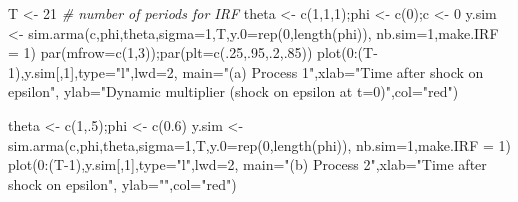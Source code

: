 \documentclass[
  12pt,
]{book}
\newenvironment{Shaded}{\begin{snugshade}}{\end{snugshade}}
\newcommand{\AttributeTok}[1]{\textcolor[rgb]{0.77,0.63,0.00}{#1}}
\newcommand{\CommentTok}[1]{\textcolor[rgb]{0.56,0.35,0.01}{\textit{#1}}}
\newcommand{\DecValTok}[1]{\textcolor[rgb]{0.00,0.00,0.81}{#1}}
\newcommand{\FloatTok}[1]{\textcolor[rgb]{0.00,0.00,0.81}{#1}}
\newcommand{\FunctionTok}[1]{\textcolor[rgb]{0.00,0.00,0.00}{#1}}
\newcommand{\NormalTok}[1]{#1}
\newcommand{\OtherTok}[1]{\textcolor[rgb]{0.56,0.35,0.01}{#1}}
\newcommand{\SpecialCharTok}[1]{\textcolor[rgb]{0.00,0.00,0.00}{#1}}
\newcommand{\StringTok}[1]{\textcolor[rgb]{0.31,0.60,0.02}{#1}}
\theoremstyle{definition}
\theoremstyle{definition}
\theoremstyle{definition}
\theoremstyle{definition}
\theoremstyle{remark}
\begin{document}
\begin{Shaded}
\begin{Highlighting}[]
\NormalTok{T }\OtherTok{\textless{}{-}} \DecValTok{21} \CommentTok{\# number of periods for IRF}
\NormalTok{theta }\OtherTok{\textless{}{-}} \FunctionTok{c}\NormalTok{(}\DecValTok{1}\NormalTok{,}\DecValTok{1}\NormalTok{,}\DecValTok{1}\NormalTok{);phi }\OtherTok{\textless{}{-}} \FunctionTok{c}\NormalTok{(}\DecValTok{0}\NormalTok{);c }\OtherTok{\textless{}{-}} \DecValTok{0}
\NormalTok{y.sim }\OtherTok{\textless{}{-}} \FunctionTok{sim.arma}\NormalTok{(c,phi,theta,}\AttributeTok{sigma=}\DecValTok{1}\NormalTok{,T,}\AttributeTok{y.0=}\FunctionTok{rep}\NormalTok{(}\DecValTok{0}\NormalTok{,}\FunctionTok{length}\NormalTok{(phi)),}
                  \AttributeTok{nb.sim=}\DecValTok{1}\NormalTok{,}\AttributeTok{make.IRF =} \DecValTok{1}\NormalTok{)}
\FunctionTok{par}\NormalTok{(}\AttributeTok{mfrow=}\FunctionTok{c}\NormalTok{(}\DecValTok{1}\NormalTok{,}\DecValTok{3}\NormalTok{));}\FunctionTok{par}\NormalTok{(}\AttributeTok{plt=}\FunctionTok{c}\NormalTok{(.}\DecValTok{25}\NormalTok{,.}\DecValTok{95}\NormalTok{,.}\DecValTok{2}\NormalTok{,.}\DecValTok{85}\NormalTok{))}
\FunctionTok{plot}\NormalTok{(}\DecValTok{0}\SpecialCharTok{:}\NormalTok{(T}\DecValTok{{-}1}\NormalTok{),y.sim[,}\DecValTok{1}\NormalTok{],}\AttributeTok{type=}\StringTok{"l"}\NormalTok{,}\AttributeTok{lwd=}\DecValTok{2}\NormalTok{,}
     \AttributeTok{main=}\StringTok{"(a) Process 1"}\NormalTok{,}\AttributeTok{xlab=}\StringTok{"Time after shock on epsilon"}\NormalTok{,}
     \AttributeTok{ylab=}\StringTok{"Dynamic multiplier (shock on epsilon at t=0)"}\NormalTok{,}\AttributeTok{col=}\StringTok{"red"}\NormalTok{)}

\NormalTok{theta }\OtherTok{\textless{}{-}} \FunctionTok{c}\NormalTok{(}\DecValTok{1}\NormalTok{,.}\DecValTok{5}\NormalTok{);phi }\OtherTok{\textless{}{-}} \FunctionTok{c}\NormalTok{(}\FloatTok{0.6}\NormalTok{)}
\NormalTok{y.sim }\OtherTok{\textless{}{-}} \FunctionTok{sim.arma}\NormalTok{(c,phi,theta,}\AttributeTok{sigma=}\DecValTok{1}\NormalTok{,T,}\AttributeTok{y.0=}\FunctionTok{rep}\NormalTok{(}\DecValTok{0}\NormalTok{,}\FunctionTok{length}\NormalTok{(phi)),}
                  \AttributeTok{nb.sim=}\DecValTok{1}\NormalTok{,}\AttributeTok{make.IRF =} \DecValTok{1}\NormalTok{)}
\FunctionTok{plot}\NormalTok{(}\DecValTok{0}\SpecialCharTok{:}\NormalTok{(T}\DecValTok{{-}1}\NormalTok{),y.sim[,}\DecValTok{1}\NormalTok{],}\AttributeTok{type=}\StringTok{"l"}\NormalTok{,}\AttributeTok{lwd=}\DecValTok{2}\NormalTok{,}
     \AttributeTok{main=}\StringTok{"(b) Process 2"}\NormalTok{,}\AttributeTok{xlab=}\StringTok{"Time after shock on epsilon"}\NormalTok{,}
     \AttributeTok{ylab=}\StringTok{""}\NormalTok{,}\AttributeTok{col=}\StringTok{"red"}\NormalTok{)}


\end{Highlighting}
\end{Shaded}
\end{document}
